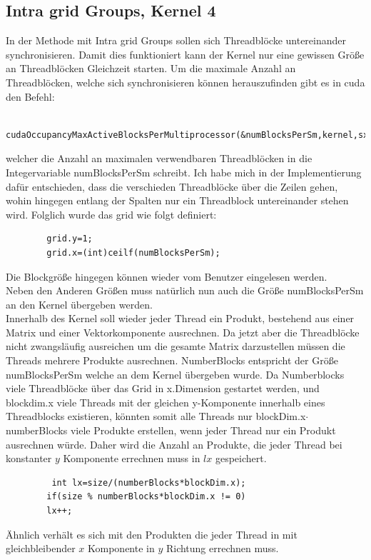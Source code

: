 \documentclass[10pt,a4paper]{article}
\begin{document}
	 \subsection{Intra grid Groups, Kernel 4}  
	 In der Methode mit Intra grid Groups sollen sich Threadblöcke untereinander synchronisieren. Damit dies funktioniert kann der Kernel nur eine gewissen Größe an Threadblöcken Gleichzeit starten. Um die maximale Anzahl an Threadblöcken, welche sich synchronisieren können herauszufinden gibt es in cuda den Befehl:
	 \begin{lstlisting}
	 	cudaOccupancyMaxActiveBlocksPerMultiprocessor(&numBlocksPerSm,kernel,sx,0);
	 \end{lstlisting}
 	welcher die Anzahl an maximalen verwendbaren Threadblöcken in die Integervariable numBlocksPerSm schreibt. Ich habe mich in der Implementierung dafür entschieden, dass die verschieden Threadblöcke über die Zeilen gehen, wohin hingegen entlang der Spalten nur ein Threadblock untereinander stehen wird. Folglich wurde das grid wie folgt definiert:
 	\begin{lstlisting}
 		grid.y=1;
 		grid.x=(int)ceilf(numBlocksPerSm);
 	\end{lstlisting}
 	Die Blockgröße hingegen können wieder vom Benutzer eingelesen werden.\\
 	Neben den Anderen Größen muss natürlich nun auch die Größe numBlocksPerSm an den Kernel übergeben werden. \\
 	Innerhalb des Kernel soll wieder jeder Thread ein Produkt, bestehend aus einer Matrix und einer Vektorkomponente ausrechnen. Da jetzt aber die Threadblöcke nicht zwangsläufig ausreichen um die gesamte Matrix darzustellen müssen die Threads mehrere Produkte ausrechnen. NumberBlocks entspricht der Größe numBlocksPerSm welche an dem Kernel übergeben wurde. Da Numberblocks viele Threadblöcke über das Grid in x.Dimension gestartet werden, und blockdim.x viele Threads mit der gleichen y-Komponente innerhalb eines Threadblocks existieren, könnten somit alle Threads nur blockDim.x$\cdot$ numberBlocks viele Produkte erstellen, wenn jeder Thread nur ein Produkt ausrechnen würde. Daher wird die Anzahl an Produkte, die jeder Thread bei konstanter $y$ Komponente errechnen muss in $lx$ gespeichert.
 	\begin{lstlisting}
 		 int lx=size/(numberBlocks*blockDim.x);
 		if(size % numberBlocks*blockDim.x != 0)
 		lx++;    
 	\end{lstlisting}
 	Ähnlich verhält es sich mit den Produkten die jeder Thread in mit gleichbleibender $x$ Komponente in $y$ Richtung errechnen muss.
\end{document}
